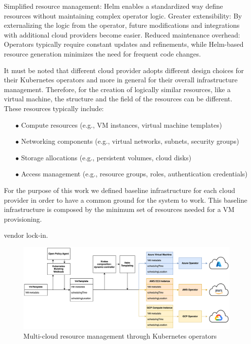Simplified resource management:  Helm enables a standardized way define resources without maintaining complex operator logic.
Greater extensibility:  By externalizing the logic from the operator, future modifications and integrations with additional cloud providers become easier.
Reduced maintenance overhead: Operators typically require constant updates and refinements, while Helm-based resource generation minimizes the need for frequent code changes.

It must be noted that different cloud provider adopts different design choices for their Kubernetes operators and more in general for their overall infrastructure management. Therefore, for the creation of logically similar resources, like a virtual machine, the structure and the field of the resources can be different. 
These resources typically include:
\begin{itemize}[itemsep=0.2pt, topsep=1pt]
  \item[$\bullet$] Compute resources (e.g., VM instances, virtual machine templates)
  \item[$\bullet$] Networking components (e.g., virtual networks, subnets, security groups)
  \item[$\bullet$] Storage allocations (e.g., persistent volumes, cloud disks)
  \item[$\bullet$] Access management (e.g., resource groups, roles, authentication credentials)
\end{itemize}


For the purpose of this work we defined baseline infrastructure for each cloud provider in order to have a common ground for the system to work. This baseline infrastructure is composed by the minimum set of resources needed for a VM provisioning.


vendor lock-in.



\begin{figure}[htb]
\centering
\includegraphics[width=1\linewidth]{images/operators.png}
\caption{Multi-cloud resource management through Kubernetes operators}
\label{fig:operators}
\end{figure}

